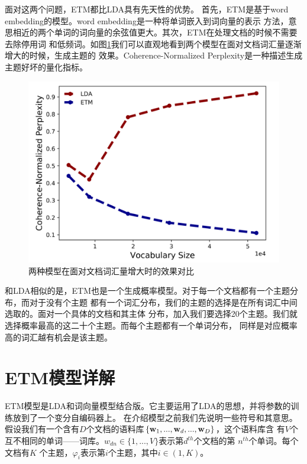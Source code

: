 \documentclass[twocolumn]{article}
\begin{document}
    面对这两个问题，ETM都比LDA具有先天性的优势。
    首先，ETM是基于word embedding的模型。word embedding是一种将单词嵌入到词向量的表示
    方法，意思相近的两个单词的词向量的余弦值更大。其次，ETM在处理文档的时候不需要去除停用词
    和低频词。如图\ref{fig:001}我们可以直观地看到两个模型在面对文档词汇量逐渐增大的时候，生成主题的
    效果。Coherence-Normalized Perplexity是一种描述生成主题好坏的量化指标。
\begin{figure}
    \centering
    \includegraphics[width=0.7    \linewidth]{figures/001}
    \caption{{\small 两种模型在面对文档词汇量增大时的效果对比}}
    \label{fig:001}
\end{figure}

    和LDA相似的是，ETM也是一个生成概率模型。对于每一个文档都有一个主题分布，而对于没有个主题
    都有一个词汇分布，我们的主题的选择是在所有词汇中间选取的。面对一个具体的文档和其主体
    分布，加入我们要选择20个主题。我们就选择概率最高的这二十个主题。而每个主题都有一个单词分布，
    同样是对应概率高的词汇越有机会是该主题。


\section{ETM模型详解}
    ETM模型是LDA和词向量模型结合版。它主要运用了LDA的思想，并将参数的训练放到了一个变分自编码器上。
    在介绍模型之前我们先说明一些符号和其意思。假设我们有一个含有$ D $个文档的语料库$ \{{{\bf{w}}_1},...,{{\bf{w}}_d},...,{{\bf{w}}_D}\} $，这个语料库含
    有$ V $个互不相同的单词——词库。$ w_{dn} \in \{1,...,V\}$表示第$ d^{th} $个文档的第
    $ n^{th} $个单词。每个文档有$ K $ 个主题，$ \varphi_i $表示第$ i $个主题，其中$ i \in (1, K) $。
    
\end{document}
